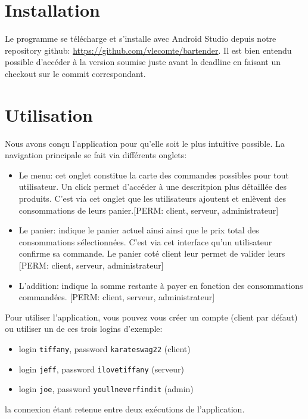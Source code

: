 \documentclass[a4paper,10pt]{article}
\begin{document}

\section{Installation}

Le programme se télécharge et s'installe avec Android Studio depuis notre repository github:
\url{https://github.com/vlecomte/bartender}.
Il est bien entendu possible d'accéder à la version soumise juste avant la deadline en faisant un checkout sur le commit correspondant.

\section{Utilisation}

Nous avons conçu l'application pour qu'elle soit le plus intuitive possible. La navigation principale se fait via différents onglets:
\begin{itemize}
    \item{Le menu: cet onglet constitue la carte des commandes possibles pour tout utilisateur. Un click permet d'accéder à une descritpion plus détaillée des produits. C'est via cet onglet que les utilisateurs ajoutent et enlèvent des consommations de leurs panier.[PERM: client, serveur, administrateur]}
    	\item{Le panier: indique le panier actuel ainsi ainsi que le prix total des consommations sélectionnées. C'est via cet interface qu'un utilisateur confirme sa commande. Le panier coté client leur permet de valider leurs [PERM: client, serveur, administrateur]}
    	\item{L'addition: indique la somme restante à payer en fonction des consommations commandées. [PERM: client, serveur, administrateur]}
    	
\end{itemize}

Pour utiliser l'application, vous pouvez vous créer un compte (client par défaut) ou utiliser un de ces trois logins d'exemple:
\begin{itemize}
    \item login \texttt{tiffany}, password \texttt{karateswag22} (client)
    \item login \texttt{jeff}, password \texttt{ilovetiffany} (serveur)
    \item login \texttt{joe}, password \texttt{youllneverfindit} (admin)
\end{itemize}
la connexion étant retenue entre deux exécutions de l'application.
\end{document}
